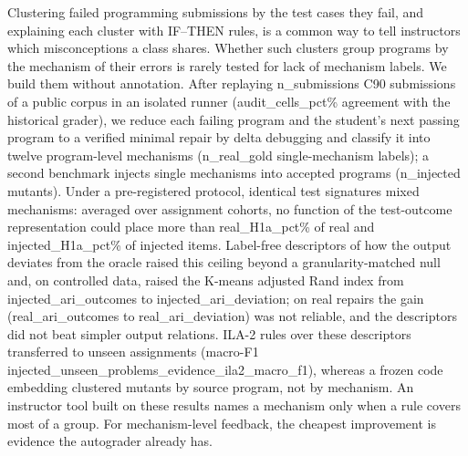 Clustering failed programming submissions by the test cases they fail, and explaining each cluster with IF--THEN rules, is a common way to tell instructors which misconceptions a class shares. Whether such clusters group programs by the mechanism of their errors is rarely tested for lack of mechanism labels. We build them without annotation. After replaying {{n_submissions}} C90 submissions of a public corpus in an isolated runner ({{audit_cells_pct}}\% agreement with the historical grader), we reduce each failing program and the student's next passing program to a verified minimal repair by delta debugging and classify it into twelve program-level mechanisms ({{n_real_gold}} single-mechanism labels); a second benchmark injects single mechanisms into accepted programs ({{n_injected}} mutants). Under a pre-registered protocol, identical test signatures mixed mechanisms: averaged over assignment cohorts, no function of the test-outcome representation could place more than {{real_H1a_pct}}\% of real and {{injected_H1a_pct}}\% of injected items. Label-free descriptors of how the output deviates from the oracle raised this ceiling beyond a granularity-matched null and, on controlled data, raised the K-means adjusted Rand index from {{injected_ari_outcomes}} to {{injected_ari_deviation}}; on real repairs the gain ({{real_ari_outcomes}} to {{real_ari_deviation}}) was not reliable, and the descriptors did not beat simpler output relations. ILA-2 rules over these descriptors transferred to unseen assignments (macro-F1 {{injected_unseen_problems_evidence_ila2_macro_f1}}), whereas a frozen code embedding clustered mutants by source program, not by mechanism. An instructor tool built on these results names a mechanism only when a rule covers most of a group. For mechanism-level feedback, the cheapest improvement is evidence the autograder already has.
